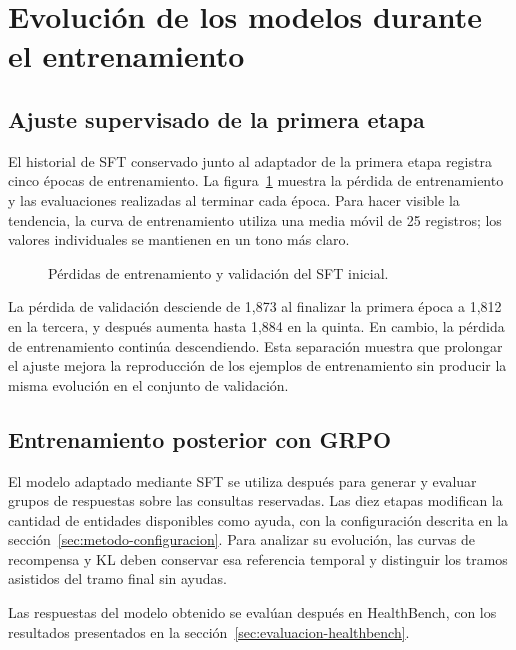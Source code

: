 \section{Evolución de los modelos durante el entrenamiento}
\label{sec:evolucion-modelos}
\subsection{Ajuste supervisado de la primera etapa}
El historial de SFT conservado junto al adaptador de la primera etapa registra cinco épocas de entrenamiento. La figura~\ref{fig:sft-inicial-curvas} muestra la pérdida de entrenamiento y las evaluaciones realizadas al terminar cada época. Para hacer visible la tendencia, la curva de entrenamiento utiliza una media móvil de 25 registros; los valores individuales se mantienen en un tono más claro.

\begin{figure}[htbp]
\centering

\caption{Pérdidas de entrenamiento y validación del SFT inicial.}
\label{fig:sft-inicial-curvas}
\end{figure}

La pérdida de validación desciende de 1,873 al finalizar la primera época a 1,812 en la tercera, y después aumenta hasta 1,884 en la quinta. En cambio, la pérdida de entrenamiento continúa descendiendo. Esta separación muestra que prolongar el ajuste mejora la reproducción de los ejemplos de entrenamiento sin producir la misma evolución en el conjunto de validación.

\subsection{Entrenamiento posterior con GRPO}
El modelo adaptado mediante SFT se utiliza después para generar y evaluar grupos de respuestas sobre las consultas reservadas. Las diez etapas modifican la cantidad de entidades disponibles como ayuda, con la configuración descrita en la sección~\ref{sec:metodo-configuracion}. Para analizar su evolución, las curvas de recompensa y KL deben conservar esa referencia temporal y distinguir los tramos asistidos del tramo final sin ayudas.

Las respuestas del modelo obtenido se evalúan después en HealthBench, con los resultados presentados en la sección~\ref{sec:evaluacion-healthbench}.
